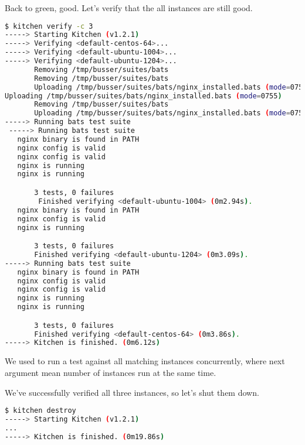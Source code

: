 Back to green, good. Let's verify that the all instances are still good.

\begin{lstlisting}[language=Bash,label=lst:testing-test-kitchen32]
$ kitchen verify -c 3
-----> Starting Kitchen (v1.2.1)
-----> Verifying <default-centos-64>...
-----> Verifying <default-ubuntu-1004>...
-----> Verifying <default-ubuntu-1204>...
       Removing /tmp/busser/suites/bats
       Removing /tmp/busser/suites/bats
       Uploading /tmp/busser/suites/bats/nginx_installed.bats (mode=0755)
Uploading /tmp/busser/suites/bats/nginx_installed.bats (mode=0755)
       Removing /tmp/busser/suites/bats
       Uploading /tmp/busser/suites/bats/nginx_installed.bats (mode=0755)
-----> Running bats test suite
 -----> Running bats test suite                                             1/3
   nginx binary is found in PATH
   nginx config is valid                                                    2/3
   nginx config is valid
   nginx is running                                                         3/3
   nginx is running

       3 tests, 0 failures
        Finished verifying <default-ubuntu-1004> (0m2.94s).                 1/3
   nginx binary is found in PATH
   nginx config is valid
   nginx is running

       3 tests, 0 failures
       Finished verifying <default-ubuntu-1204> (0m3.09s).
-----> Running bats test suite
   nginx binary is found in PATH
   nginx config is valid                                                    2/3
   nginx config is valid
   nginx is running                                                         3/3
   nginx is running

       3 tests, 0 failures
       Finished verifying <default-centos-64> (0m3.86s).
-----> Kitchen is finished. (0m6.12s)
\end{lstlisting}

We used  to run a test against all matching instances concurrently, where next argument mean number of instances run at the same time.

We've successfully verified all three instances, so let's shut them down.

\begin{lstlisting}[language=Bash,label=lst:testing-test-kitchen33]
$ kitchen destroy
-----> Starting Kitchen (v1.2.1)
...
-----> Kitchen is finished. (0m19.86s)
\end{lstlisting}




